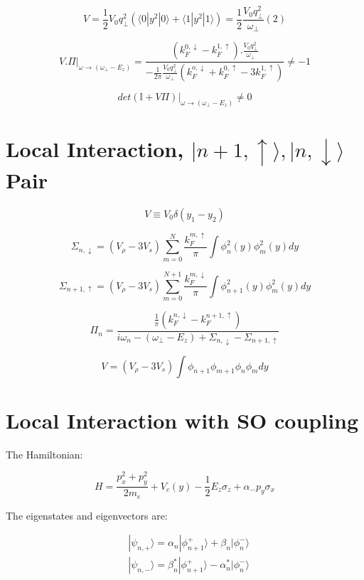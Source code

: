 \[V=\frac{1}{2} V_0 q_\perp^2 \left( \langle 0|y^2|0\rangle + \langle 1|y^2|1\rangle \right) = \frac{1}{2} \frac{V_0 q_\perp^2}{\omega_{\perp}} (2)\]

\[V.\Pi|_{\omega\rightarrow (\omega_{\perp}-E_z)}=\frac{(k_F^{0,\downarrow}-k_F^{1,\uparrow}) . \frac{V_0 q_\perp^2}{\omega_{\perp}}}{-\frac{1}{2\pi} \frac{V_0 q_\perp^2}{\omega_{\perp}} (k_F^{o,\downarrow}+k_F^{0,\uparrow}-3k_F^{1,\uparrow})}\neq -1\]

\[det(\mathbb{I}+V\Pi)|_{\omega\rightarrow (\omega_{\perp}-E_z)}\neq0\]

\section{Local Interaction, $|n+1,\uparrow\rangle,|n,\downarrow\rangle$ Pair}

\[V\equiv V_0 \delta(y_1-y_2)\]

\[\Sigma_{n,\downarrow}=(V_\rho-3V_s)\sum\limits_{m=0}^N\frac{k_F^{m,\uparrow}}{\pi}\int\phi_n^2(y)\phi_m^2(y)dy\]

\[\Sigma_{n+1,\uparrow}=(V_\rho-3V_s)\sum\limits_{m=0}^{N+1}\frac{k_F^{m,\downarrow}}{\pi}\int\phi_{n+1}^2(y)\phi_m^2(y)dy\]

\[\Pi_n=\frac{\frac{1}{\pi}(k_F^{n,\downarrow}-k_F^{n+1,\uparrow})}{i\omega_n-(\omega_{\perp}-E_z)+\Sigma_{n,\downarrow}-\Sigma_{n+1,\uparrow}}\]

\[V=(V_\rho-3V_s)\int\phi_{n+1}\phi_{m+1}\phi_n\phi_m dy\]


\section{Local Interaction with SO coupling}

The Hamiltonian:

\begin{equation}
	H= \frac{p_x^2+p_y^2}{2m_e} +V_c(y)- \frac{1}{2} E_z \sigma_z + \alpha_- p_y \sigma_x
\end{equation}

The eigenstates and eigenvectors are:

\begin{equation}
	\begin{split}
		&|\psi_{n,+}\rangle = \alpha_n |\phi_{n+1}^+\rangle + \beta_n |\phi_n^-\rangle \\
	&|\psi_{n,-}\rangle = \beta_n^* |\phi_{n+1}^+\rangle - \alpha_n^* |\phi_n^-\rangle
	\end{split}
\end{equation}

